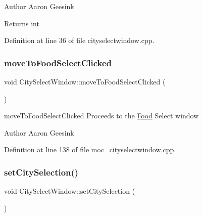 \begin{DoxyAuthor}{Author}
Aaron Geesink 
\end{DoxyAuthor}
\begin{DoxyReturn}{Returns}
int 
\end{DoxyReturn}


Definition at line 36 of file cityselectwindow.\+cpp.

\mbox{\label{class_city_select_window_a6181200e04334e668f39df57af243fff}} 
\subsubsection{\texorpdfstring{moveToFoodSelectClicked}{moveToFoodSelectClicked}}
{\footnotesize\ttfamily void City\+Select\+Window\+::move\+To\+Food\+Select\+Clicked (\begin{DoxyParamCaption}{ }\end{DoxyParamCaption})\hspace{0.3cm}{\ttfamily [signal]}}



move\+To\+Food\+Select\+Clicked Proceeds to the \mbox{\hyperlink{class_food}{Food}} Select window 

\begin{DoxyAuthor}{Author}
Aaron Geesink 
\end{DoxyAuthor}


Definition at line 138 of file moc\+\_\+cityselectwindow.\+cpp.

\mbox{\label{class_city_select_window_a771b0feebb7c7fdb1714917b337a37f3}} 
\subsubsection{\texorpdfstring{setCitySelection()}{setCitySelection()}}
{\footnotesize\ttfamily void City\+Select\+Window\+::set\+City\+Selection (\begin{DoxyParamCaption}{ }\end{DoxyParamCaption})}



